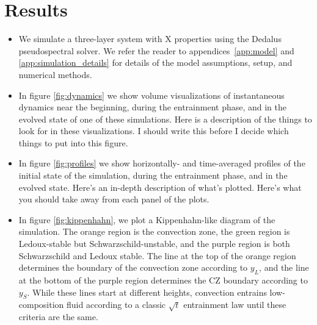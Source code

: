 \section{Results}
\label{sec:result}

\begin{itemize}
\item We simulate a three-layer system with X properties using the Dedalus pseudospectral solver.
We refer the reader to appendices~\ref{app:model} and \ref{app:simulation_details} for details of the model assumptions, setup, and numerical methods.
\item In figure \ref{fig:dynamics} we show volume visualizations of instantaneous dynamics near the beginning, during the entrainment phase, and in the evolved state of one of these simulations.
Here is a description of the things to look for in these visualizations.
I should write this before I decide which things to put into this figure.
\item In figure \ref{fig:profiles} we show horizontally- and time-averaged profiles of the initial state of the simulation, during the entrainment phase, and in the evolved state.
Here's an in-depth description of what's plotted.
Here's what you should take away from each panel of the plots.
\item In figure \ref{fig:kippenhahn}, we plot a Kippenhahn-like diagram of the simulation.
The orange region is the convection zone, the green region is Ledoux-stable but Schwarzschild-unstable, and the purple region is both Schwarzschild and Ledoux stable.
The line at the top of the orange region determines the boundary of the convection zone according to $y_L$, and the line at the bottom of the purple region determines the CZ boundary according to $y_S$.
While these lines start at different heights, convection entrains low-composition fluid according to a classic $\sqrt{t}$ entrainment law until these criteria are the same.
\end{itemize}



